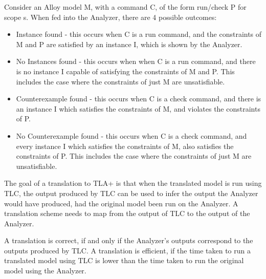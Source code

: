 Consider an Alloy model M, with a command C, of the form run/check P for scope s. When fed into the Analyzer, there are 4 possible outcomes:

\begin{itemize}
  \item Instance found - this occurs when C is a run command, and the constraints of M and P are satisfied by an instance I, which is shown by the Analyzer.
  \item No Instances found - this occurs when when C is a run command, and there is no instance I capable of satisfying the constraints of M and P. This includes the case where the constraints of just M are unsatisfiable. 
  \item Counterexample found - this occurs when C is a check command, and there is an instance I which satisfies the constraints of M, and violates the constraints of P.
  \item No Counterexample found - this occurs when C is a check command, and every instance I which satisfies the constraints of M, also satisfies the constraints of P. This includes the case where the constraints of just M are unsatisfiable. 
\end{itemize}

The goal of a translation to TLA+ is that when the translated model is run using TLC, the output produced by TLC can be used to infer the output the Analyzer would have produced, had the original model been run on the Analyzer. A translation scheme needs to map from the output of TLC to the output of the Analyzer.

A translation is correct, if and only if the Analyzer's outputs correspond to the outputs produced by TLC. A translation is efficient, if the time taken to run a translated model using TLC is lower than the time taken to run the original model using the Analyzer.